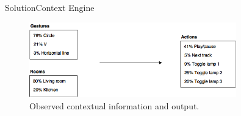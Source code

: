 \begin{frame}{Solution}{Context Engine}
\begin{figure}[h]
\centering
\includegraphics[width=0.8\textwidth]{../images/bayesian-network-input-output}
\caption{Observed contextual information and output.}
\end{figure}
\end{frame}


